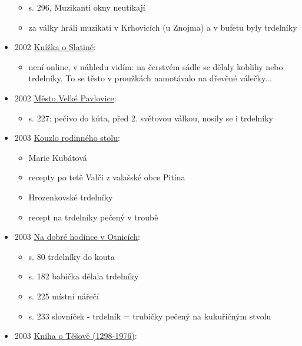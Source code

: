 \begin{itemize}
  \begin{itemize}
  \tightlist
  \item
    s. 296, Muzikanti okny neutíkají
  \item
    za války hráli muzikati v Krhovicích (u Znojma) a v bufetu byly
    trdelníky
  \end{itemize}
\item
  2002
  \href{https://ceskadigitalniknihovna.cz/uuid/uuid:b70d1490-9c83-11ed-b51a-005056827e52}{Knížka
  o Slatině}:

  \begin{itemize}
  \tightlist
  \item
    není online, v náhledu vidím: na čerstvém sádle se dělaly koblihy
    nebo trdelníky. To se těsto v proužkách namotávalo na dřevěné
    válečky...
  \end{itemize}
\item
  2002
  \href{https://ceskadigitalniknihovna.cz/uuid/uuid:2f7b11a0-3d86-11ed-b06c-005056827e52}{Město
  Velké Pavlovice}:

  \begin{itemize}
  \tightlist
  \item
    s. 227: pečivo do kúta, před 2. světovou válkou, nosily se i
    trdelníky
  \end{itemize}
\item
  2003
  \href{https://ceskadigitalniknihovna.cz/uuid/uuid:99baad60-eb86-11e3-a2c6-005056827e51}{Kouzlo
  rodinného stolu}:

  \begin{itemize}
  \tightlist
  \item
    Marie Kubátová
  \item
    recepty po tetě Valči z valašské obce Pitína
  \item
    Hrozenkovské trdelníky
  \item
    recept na trdelníky pečený v troubě
  \end{itemize}
\item
  2003
  \href{https://ceskadigitalniknihovna.cz/view/uuid:cc3e0ec0-084a-11e6-a611-005056827e51?page=uuid\%3Afaea6360-21de-11e6-8803-005056827e51&fulltext=trdeln\%C3\%ADk\%20OR\%20trdeln\%C3\%ADky\%20OR\%20trdeln\%C3\%ADk\%C5\%AF&source=mzk}{Na
  dobré hodince v Otnicích}:

  \begin{itemize}
  \tightlist
  \item
    s. 80 trdelníky do kouta
  \item
    s. 182 babička dělala trdelníky
  \item
    s. 225 místní nářečí
  \item
    s. 233 slovníček - trdelník = trubičky pečený na kukuřičným stvolu
  \end{itemize}
\item
  2003
  \href{https://ceskadigitalniknihovna.cz/uuid/uuid:d9f114f0-527a-11e3-ac69-005056827e51}{Kniha
  o Těšově (1298-1976)}:


\end{itemize}
